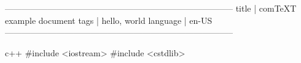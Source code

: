 --------------------------------------------------------------------------------
title    | comTeXT example document
tags     | hello, world
language | en-US
--------------------------------------------------------------------------------

\usepackage{stdlib}




\begin{std@code}{c++}
#include <iostream>
#include <cstdlib>
\end{std@code}



